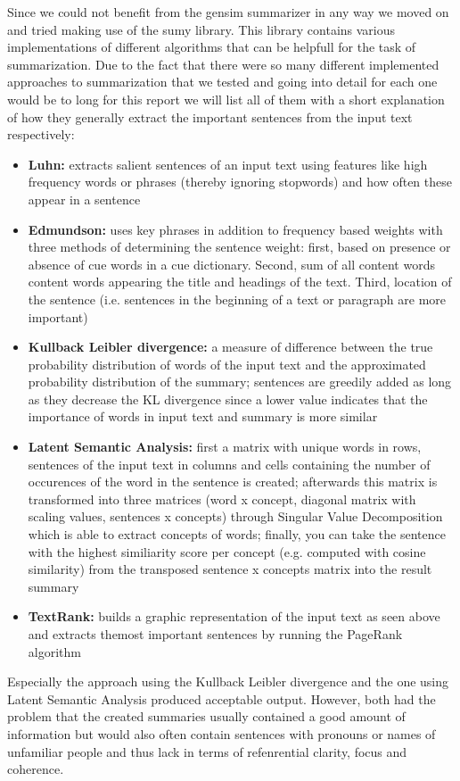 Since we could not benefit from the gensim summarizer in any way we moved on and tried making use of the sumy library. This library contains various implementations of different algorithms that can be helpfull for the task of summarization. Due to the fact that there were so many different implemented approaches to summarization that we tested and going into detail for each one would be to long for this report we will list all of them with a short explanation of how they generally extract the important sentences from the input text respectively: 
\begin{itemize}
	\item \textbf{Luhn:} extracts salient sentences of an input text using features like high frequency words or phrases (thereby ignoring stopwords) and how often these appear in a sentence
	\item \textbf{Edmundson:} uses key phrases in addition to frequency based weights with three methods of determining the sentence weight: first, based on presence or absence of cue words in a cue dictionary. Second, sum of all content words content words appearing the title and headings of the text. Third, location of the sentence (i.e. sentences in the beginning of a text or paragraph are more important)
	\item \textbf{Kullback Leibler divergence:} a measure of difference between the true probability distribution of words of the input text and the approximated probability distribution of the summary; sentences are greedily added as long as they decrease the KL divergence since a lower value indicates that the importance of words in input text and summary is more similar
	\item \textbf{Latent Semantic Analysis:} first a matrix with unique words in rows, sentences of the input text in columns and cells containing the number of occurences of the word in the sentence is created; afterwards this matrix is transformed into  three matrices (word x concept, diagonal matrix with scaling values, sentences x concepts) through Singular Value Decomposition which is able to extract concepts of words; finally, you can take the sentence with the highest similiarity score per concept (e.g. computed with cosine similarity) from the transposed sentence x concepts matrix into the result summary 
	\item \textbf{TextRank:} builds a graphic representation of the input text as seen above and extracts themost important sentences by running the PageRank algorithm	
\end{itemize} 
Especially the approach using the Kullback Leibler divergence and the one using Latent Semantic Analysis produced acceptable output. However, both had the problem that the created summaries usually contained a good amount of information but would also often contain sentences with pronouns or names of unfamiliar people and thus lack in terms of refenrential clarity, focus and coherence. 

